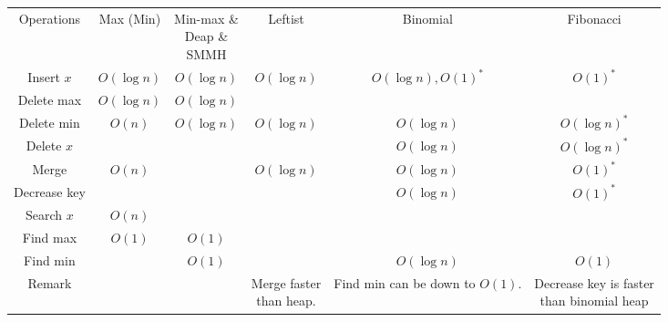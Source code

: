 \begin{enumerate}
\begin{table}[H]
\begin{tabular}{|c|c|c|c|c|c|}
            \Xhline{3\arrayrulewidth}
            Operations & Max (Min) & \makecell{Min-max \&\\Deap \&\\SMMH} & Leftist & Binomial & Fibonacci \\
            \Xhline{2\arrayrulewidth}
            Insert $x$ & $O(\log n)$ & $O(\log n)$ & $O(\log n)$ & $O(\log n), O(1)^*$ & $O(1)^*$ \\
            \hline
            Delete max & $O(\log n)$ & $O(\log n)$ & & & \\
            \hline
            Delete min & $O(n)$ & $O(\log n)$ & $O(\log n)$ & $O(\log n)$ & $O(\log n)^*$ \\
            \hline
            Delete $x$ & & & & $O(\log n)$ & $O(\log n)^*$ \\
            \hline
            Merge & $O(n)$ & & $O(\log n)$ & $O(\log n)$ & $O(1)^*$ \\
            \hline
            Decrease key & & & & $O(\log n)$ & $O(1)^*$ \\
            \hline
            Search $x$ & $O(n)$ & & & & \\
            \hline
            Find max & $O(1)$ & $O(1)$ & & & \\
            \hline
            Find min & & $O(1)$ & & $O(\log n)$ & $O(1)$ \\
            \hline
            Remark & & & \makecell{Merge faster\\than heap.} & \makecell{Find min can be\\down to $O(1)$.} & \makecell{Decrease key is faster\\than binomial heap} \\
            \hline
        \end{tabular}
    \end{table} 
\end{enumerate}

\pagebreak
